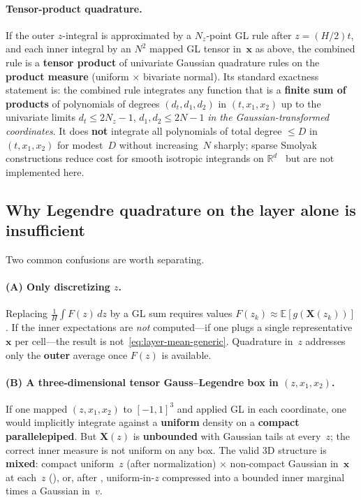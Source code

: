 \documentclass[11pt,a4paper]{article}
\begin{document}
\paragraph{Tensor-product quadrature.}
If the outer $z$-integral is approximated by a $N_z$-point GL rule after $z=(H/2)t$, and each inner integral by an $N^2$ mapped GL tensor in~$\mathbf{x}$ as above, the combined rule is a \textbf{tensor product} of univariate Gaussian quadrature rules on the \textbf{product measure} (uniform $\times$ bivariate normal).
Its standard exactness statement is: the combined rule integrates any function that is a \textbf{finite sum of products} of polynomials of degrees $(d_t,d_1,d_2)$ in $(t,x_1,x_2)$ up to the univariate limits $d_t\le 2N_z-1$, $d_1,d_2\le 2N-1$ \emph{in the Gaussian-transformed coordinates}.
It does \textbf{not} integrate all polynomials of total degree $\le D$ in $(t,x_1,x_2)$ for modest~$D$ without increasing~$N$ sharply; sparse Smolyak constructions reduce cost for smooth isotropic integrands on $\mathbb{R}^d$~\cite{gerstner} but are not implemented here.

\subsection{Why Legendre quadrature on the layer alone is insufficient}
Two common confusions are worth separating.

\paragraph{(A) Only discretizing $z$.}
Replacing $\frac{1}{H}\int F(z)\,dz$ by a GL sum requires values $F(z_k)\approx\mathbb{E}[g(\mathbf{X}(z_k))]$.
If the inner expectations are \emph{not} computed---if one plugs a single representative $\mathbf{x}$ per cell---the result is not~\eqref{eq:layer-mean-generic}.
Quadrature in~$z$ addresses only the \textbf{outer} average once $F(z)$ is available.

\paragraph{(B) A three-dimensional tensor Gauss--Legendre box in $(z,x_1,x_2)$.}
If one mapped $(z,x_1,x_2)$ to $[-1,1]^3$ and applied GL in each coordinate, one would implicitly integrate against a \textbf{uniform} density on a \textbf{compact parallelepiped}.
But $\mathbf{X}(z)$ is \textbf{unbounded} with Gaussian tails at every~$z$; the correct inner measure is not uniform on any box.
The valid 3D structure is \textbf{mixed}: compact uniform~$z$ (after normalization) $\times$ non-compact Gaussian in~$\mathbf{x}$ at each~$z$ (\columntensor), or, after \profileros, uniform-in-$z$ compressed into a bounded inner marginal times a Gaussian in~$v$.
\end{document}
